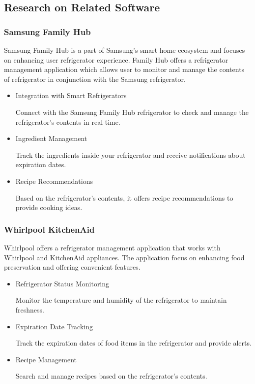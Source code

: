 \documentclass[conference]{IEEEtran}
\begin{document}
\subsection{Research on Related Software}
\subsubsection{Samsung Family Hub}

    Samsung Family Hub is a part of Samsung's smart home ecosystem and focuses on enhancing user refrigerator experience. Family Hub offers a refrigerator management application which allows user to monitor and manage the contents of refrigerator in conjunction with the Samsung refrigerator.


\begin{itemize}
    \item Integration with Smart Refrigerators\par
    Connect with the Samsung Family Hub refrigerator to check and manage the refrigerator's contents in real-time.
    \item Ingredient Management\par
    Track the ingredients inside your refrigerator and receive notifications about expiration dates.
    \item Recipe Recommendations\par
    Based on the refrigerator's contents, it offers recipe recommendations to provide cooking ideas.
\end{itemize}
\subsubsection{Whirlpool KitchenAid}
    Whirlpool offers a refrigerator management application that works with Whirlpool and KitchenAid appliances. The application focus on enhancing food preservation and offering convenient features. 

\begin{itemize}
    \item Refrigerator Status Monitoring\par
    Monitor the temperature and humidity of the refrigerator to maintain freshness.
    \item Expiration Date Tracking\par
    Track the expiration dates of food items in the refrigerator and provide alerts.
    \item Recipe Management\par
    Search and manage recipes based on the refrigerator's contents.
\end{itemize}
\end{document}
